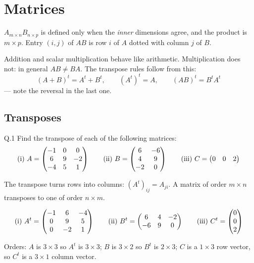 \chapter{Matrices}


\begin{keyidea}
$A_{m\times n}B_{n\times p}$ is defined only when the \emph{inner} dimensions
agree, and the product is $m\times p$. Entry $(i,j)$ of $AB$ is row $i$ of $A$
dotted with column $j$ of $B$.

\medskip
Addition and scalar multiplication behave like arithmetic. Multiplication does
not: in general $AB\neq BA$. The transpose rules follow from this:
\[
(A+B)^{t}=A^{t}+B^{t},\qquad (A^{t})^{t}=A,\qquad
\boxed{(AB)^{t}=B^{t}A^{t}}
\]
--- note the reversal in the last one.
\end{keyidea}

\section{Transposes}

\begin{question}{Q.1}
Find the transpose of each of the following matrices:
\[
\text{(i) } A=\begin{pmatrix}-1&0&0\\6&9&-2\\-4&5&1\end{pmatrix}\qquad
\text{(ii) } B=\begin{pmatrix}6&-6\\4&9\\-2&0\end{pmatrix}\qquad
\text{(iii) } C=\begin{pmatrix}0&0&2\end{pmatrix}
\]
\end{question}

\begin{solution}
The transpose turns rows into columns: $(A^{t})_{ij}=A_{ji}$. A matrix of order
$m\times n$ transposes to one of order $n\times m$.

\[
\text{(i) } A^{t}=\begin{pmatrix}-1&6&-4\\0&9&5\\0&-2&1\end{pmatrix}
\qquad
\text{(ii) } B^{t}=\begin{pmatrix}6&4&-2\\-6&9&0\end{pmatrix}
\qquad
\text{(iii) } C^{t}=\begin{pmatrix}0\\0\\2\end{pmatrix}
\]

Orders: $A$ is $3\times3$ so $A^{t}$ is $3\times3$; $B$ is $3\times 2$ so
$B^{t}$ is $2\times 3$; $C$ is a $1\times3$ row vector, so $C^{t}$ is a
$3\times1$ column vector.

\end{solution}

